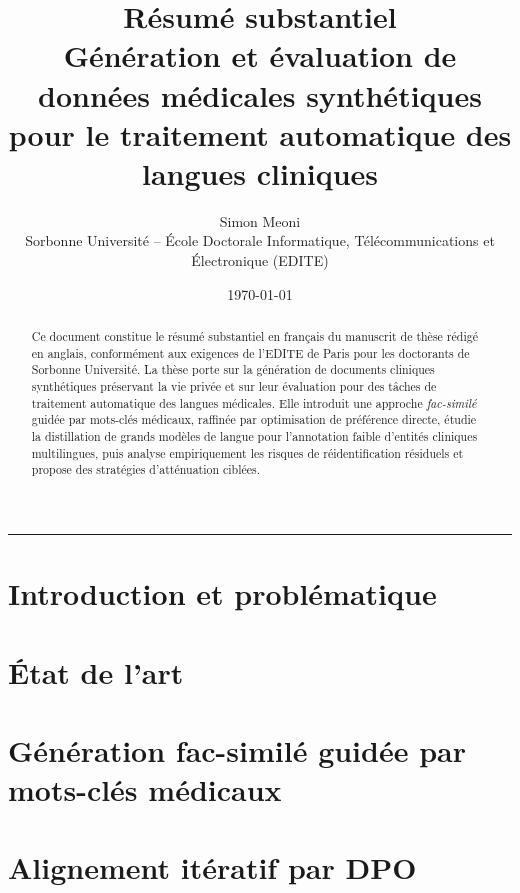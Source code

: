 \documentclass[11pt,a4paper]{article}
\title{\textbf{Résumé substantiel}\\[0.4em]
\large Génération et évaluation de données médicales synthétiques\\
pour le traitement automatique des langues cliniques}
\author{Simon Meoni\\
\small Sorbonne Université -- École Doctorale Informatique, Télécommunications et Électronique (EDITE)}
\date{\today}
\begin{document}
\maketitle

\begin{abstract}
\noindent
Ce document constitue le résumé substantiel en français du manuscrit de thèse rédigé en anglais,
conformément aux exigences de l'EDITE de Paris pour les doctorants de Sorbonne Université.
La thèse porte sur la génération de documents cliniques synthétiques préservant la vie privée
et sur leur évaluation pour des tâches de traitement automatique des langues médicales.
Elle introduit une approche \textit{fac-similé} guidée par mots-clés médicaux, raffinée par
optimisation de préférence directe, étudie la distillation de grands modèles de langue pour
l'annotation faible d'entités cliniques multilingues, puis analyse empiriquement les risques
de réidentification résiduels et propose des stratégies d'atténuation ciblées.
\end{abstract}

\tableofcontents
\vspace{1em}
\hrule
\vspace{1em}

\section{Introduction et problématique}
\label{sec:introduction}


\section{État de l'art}
\label{sec:related}



\section{Génération fac-similé guidée par mots-clés médicaux}
\label{sec:facsimile}


\section{Alignement itératif par DPO}
\label{sec:dpo}

\end{document}
